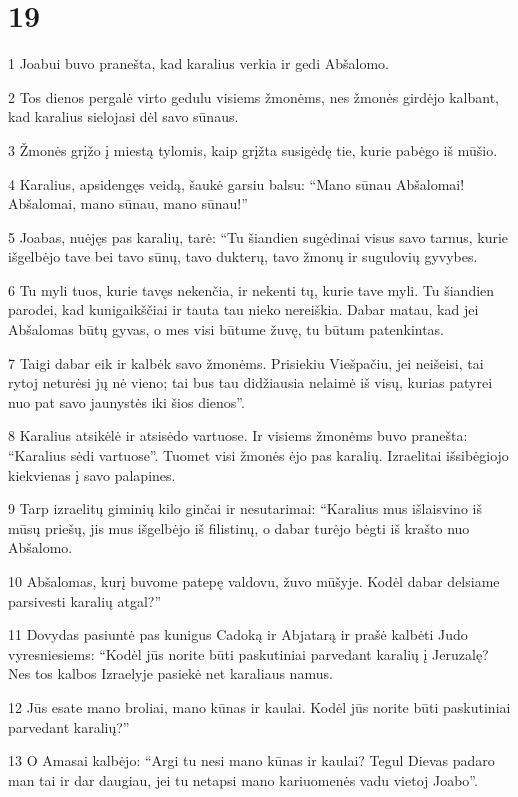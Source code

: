 \chapter{19}


\par 1 Joabui buvo pranešta, kad karalius verkia ir gedi Abšalomo. 
\par 2 Tos dienos pergalė virto gedulu visiems žmonėms, nes žmonės girdėjo kalbant, kad karalius sielojasi dėl savo sūnaus. 
\par 3 Žmonės grįžo į miestą tylomis, kaip grįžta susigėdę tie, kurie pabėgo iš mūšio. 
\par 4 Karalius, apsidengęs veidą, šaukė garsiu balsu: “Mano sūnau Abšalomai! Abšalomai, mano sūnau, mano sūnau!” 
\par 5 Joabas, nuėjęs pas karalių, tarė: “Tu šiandien sugėdinai visus savo tarnus, kurie išgelbėjo tave bei tavo sūnų, tavo dukterų, tavo žmonų ir sugulovių gyvybes. 
\par 6 Tu myli tuos, kurie tavęs nekenčia, ir nekenti tų, kurie tave myli. Tu šiandien parodei, kad kunigaikščiai ir tauta tau nieko nereiškia. Dabar matau, kad jei Abšalomas būtų gyvas, o mes visi būtume žuvę, tu būtum patenkintas. 
\par 7 Taigi dabar eik ir kalbėk savo žmonėms. Prisiekiu Viešpačiu, jei neišeisi, tai rytoj neturėsi jų nė vieno; tai bus tau didžiausia nelaimė iš visų, kurias patyrei nuo pat savo jaunystės iki šios dienos”. 
\par 8 Karalius atsikėlė ir atsisėdo vartuose. Ir visiems žmonėms buvo pranešta: “Karalius sėdi vartuose”. Tuomet visi žmonės ėjo pas karalių. Izraelitai išsibėgiojo kiekvienas į savo palapines. 
\par 9 Tarp izraelitų giminių kilo ginčai ir nesutarimai: “Karalius mus išlaisvino iš mūsų priešų, jis mus išgelbėjo iš filistinų, o dabar turėjo bėgti iš krašto nuo Abšalomo. 
\par 10 Abšalomas, kurį buvome patepę valdovu, žuvo mūšyje. Kodėl dabar delsiame parsivesti karalių atgal?” 
\par 11 Dovydas pasiuntė pas kunigus Cadoką ir Abjatarą ir prašė kalbėti Judo vyresniesiems: “Kodėl jūs norite būti paskutiniai parvedant karalių į Jeruzalę? Nes tos kalbos Izraelyje pasiekė net karaliaus namus. 
\par 12 Jūs esate mano broliai, mano kūnas ir kaulai. Kodėl jūs norite būti paskutiniai parvedant karalių?” 
\par 13 O Amasai kalbėjo: “Argi tu nesi mano kūnas ir kaulai? Tegul Dievas padaro man tai ir dar daugiau, jei tu netapsi mano kariuomenės vadu vietoj Joabo”. 
